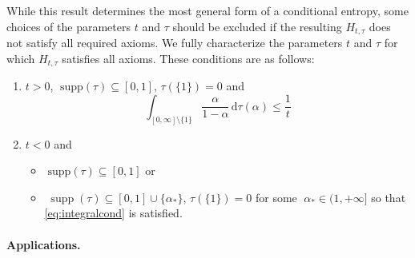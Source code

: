 \documentclass[aps,pra,11pt,onecolumn,nofootinbib,tightenlines]{revtex4-2}
\theoremstyle{definition}
\begin{document}
 
While this result determines the most general form of a conditional entropy, some choices of the parameters \(t\) and \(\tau\) should be excluded if the resulting \(H_{t,\tau}\) does not satisfy all required axioms.
We fully characterize the parameters $t$ and $\tau$ for which $H_{t,\tau}$ satisfies all axioms.
These conditions are as follows:
\begin{enumerate}
    \item $t> 0$, $\;\text{supp}(\tau) \subseteq [0,1]$, $\tau(\{1\})=0$ and
    \begin{equation}\label{eq:integralcond}
    \int_{[0,\infty]\setminus\{1\}}\frac{\alpha}{1-\alpha}\,\mathrm{d}\tau(\alpha)\leq \frac{1}{t}
    \end{equation}
    \item $t < 0$ and
    \begin{itemize}
    \item[(a)] $\;\text{supp}(\tau) \subseteq [0,1]$ or
    \item[(b)] $\;\operatorname{supp}(\tau) \subseteq [0,1] \cup \{\alpha_*\}$, $\tau(\{1\})=0$ for some $\;\alpha_* \in (1, +\infty]$ so that   \eqref{eq:integralcond} is satisfied.
    \end{itemize}
\end{enumerate}


\paragraph*{Applications.}
\end{document}
